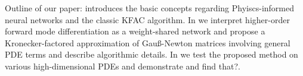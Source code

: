 Outline of our paper:  introduces the basic concepts regarding Phyiscs-informed neural networks and the classic KFAC algorithm. 
In  we interpret higher-order forward mode differentiation as a weight-shared network and propose a Kronecker-factored approximation of Gauß-Newton matrices involving general PDE terms and describe algorithmic details. 
In  we test the proposed method on various high-dimensional PDEs and demonstrate and find that?. 


\begin{comment}
    For the important example of the Laplace operator the corresponding Gauß-Newton matrix %
    takes the form
    \begin{equation*}
        \mG_{ij}
        =
        \int_\Omega \Delta \partial_{\theta_i} u_\theta \Delta \partial_{\theta_j} u_\theta \, \mathrm dx, 
    \end{equation*}
    where $u_\theta$ denotes the neural network ansatz and $\Omega\subset\mathbb R^d$ is the computational domain. Following the KFAC literature \cite{martens2015optimizing}, $G$ is approximated by a matrix of the form $\operatorname{diag}(\mA_1\otimes\mB_1, \dots, \mA_L\otimes\mB_L)$ which, due to the comparatively small size of the factors $\mA_i$ and $\mB_i$ and the identity $(\mA \otimes \mB)^{-1} = \mA^{-1} \otimes \mB^{-1}$, is \emph{much} faster to invert than $\mG$. Note that differential operators like the Laplacian complicate the computational graph considerably, which precludes the direct application of the existing KFAC approximations.
\end{comment}

